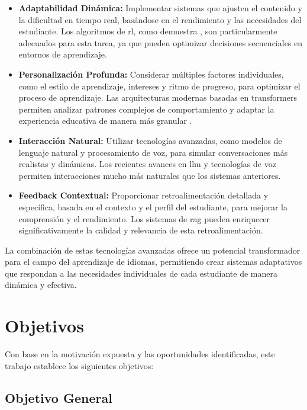\begin{itemize}
  \item \textbf{Adaptabilidad Dinámica:} Implementar sistemas que ajusten el contenido y la dificultad en tiempo real, basándose en el rendimiento y las necesidades del estudiante. Los algoritmos de \gls{rl}, como demuestra \cite{williams2017educational}, son particularmente adecuados para esta tarea, ya que pueden optimizar decisiones secuenciales en entornos de aprendizaje.
  
  \item \textbf{Personalización Profunda:} Considerar múltiples factores individuales, como el estilo de aprendizaje, intereses y ritmo de progreso, para optimizar el proceso de aprendizaje. Las arquitecturas modernas basadas en \gls{transformers} permiten analizar patrones complejos de comportamiento y adaptar la experiencia educativa de manera más granular \cite{vaswani2017attention}.
  
  \item \textbf{Interacción Natural:} Utilizar tecnologías avanzadas, como modelos de lenguaje natural y procesamiento de voz, para simular conversaciones más realistas y dinámicas. Los recientes avances en \gls{llm} \cite{brown2020language} y tecnologías de voz \cite{graves2013speech} permiten interacciones mucho más naturales que los sistemas anteriores.
  
  \item \textbf{Feedback Contextual:} Proporcionar retroalimentación detallada y específica, basada en el contexto y el perfil del estudiante, para mejorar la comprensión y el rendimiento. Los sistemas de \gls{rag} \cite{lewis2020retrieval} pueden enriquecer significativamente la calidad y relevancia de esta retroalimentación.
\end{itemize}

La combinación de estas tecnologías avanzadas ofrece un potencial transformador para el campo del aprendizaje de idiomas, permitiendo crear sistemas adaptativos que respondan a las necesidades individuales de cada estudiante de manera dinámica y efectiva.

\section{Objetivos}
\label{sec:objetivos}

Con base en la motivación expuesta y las oportunidades identificadas, este trabajo establece los siguientes objetivos:

\subsection{Objetivo General}
\label{subsec:objetivo-general}

